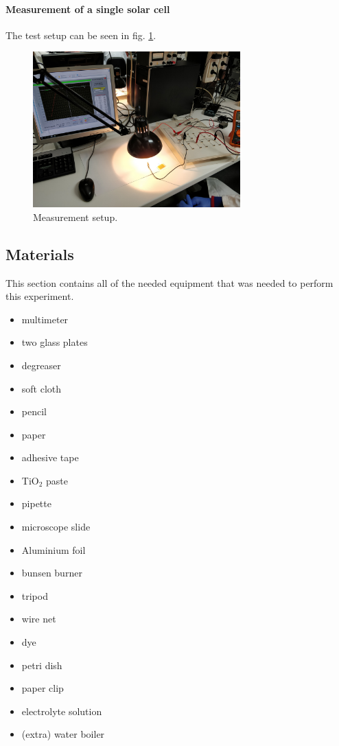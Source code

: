 \documentclass[conference]{IEEEtran}
\begin{document}
\paragraph{Measurement of a single solar cell}
The test setup can be seen in fig. \ref{fig:cellmeasurement}.

\begin{figure}[H]
\centering
\includegraphics[width=8.0cm]{img/CellMeasurement.jpg}
\caption{Measurement setup.}
\label{fig:cellmeasurement} %
\end{figure}

\subsection{Materials}
This section contains all of the needed equipment that was needed to perform this experiment.\\
\begin{itemize}
  \item multimeter
  \item two glass plates
  \item degreaser
  \item soft cloth
  \item pencil
  \item paper
  \item adhesive tape
  \item TiO$_2$ paste
  \item pipette
  \item microscope slide
  \item Aluminium foil
  \item bunsen burner
  \item tripod
  \item wire net
  \item dye
  \item petri dish
  \item paper clip
  \item electrolyte solution
  \item (extra) water boiler
  
\end{itemize}
\end{document}
